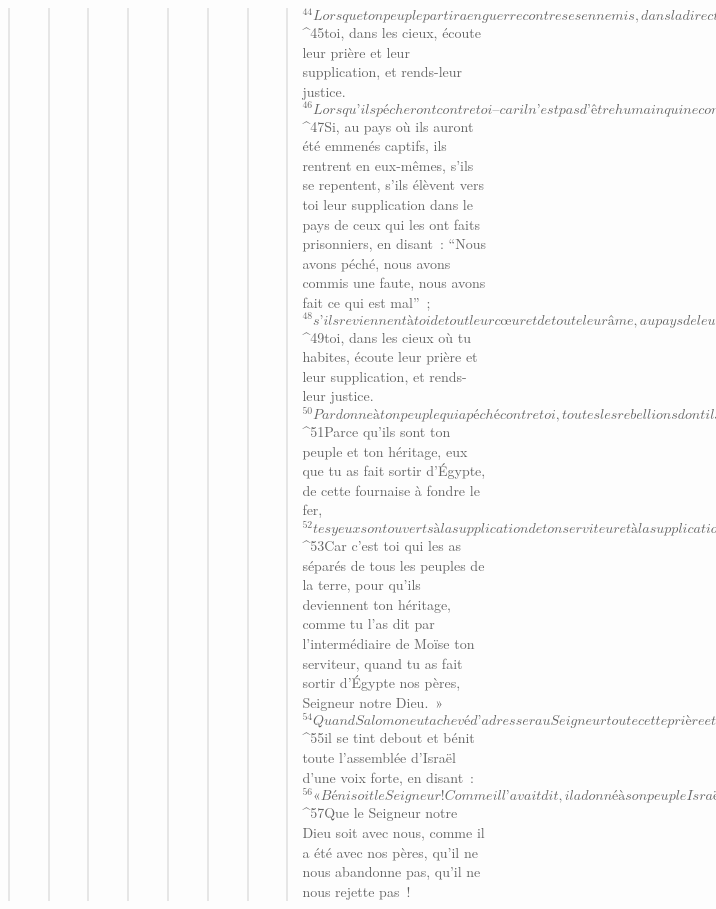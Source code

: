 \begin{verse}
\begin{verse}
\begin{verse}
\begin{verse}
\begin{verse}
\begin{verse}
\begin{verse}
\begin{verse}
${}^{44}Lorsque ton peuple partira en guerre contre ses ennemis, dans la direction où tu l’auras envoyé, et qu’il priera le Seigneur, tourné vers la Ville que tu as choisie et vers la Maison que j’ai bâtie pour ton nom, 
${}^{45}toi, dans les cieux, écoute leur prière et leur supplication, et rends-leur justice.
${}^{46}Lorsqu’ils pécheront contre toi – car il n’est pas d’être humain qui ne commette quelque péché – et que tu seras irrité contre eux, alors tu les livreras à la merci de leurs ennemis, et leurs vainqueurs les emmèneront captifs dans un pays ennemi, lointain ou proche. 
${}^{47}Si, au pays où ils auront été emmenés captifs, ils rentrent en eux-mêmes, s’ils se repentent, s’ils élèvent vers toi leur supplication dans le pays de ceux qui les ont faits prisonniers, en disant : “Nous avons péché, nous avons commis une faute, nous avons fait ce qui est mal” ; 
${}^{48}s’ils reviennent à toi de tout leur cœur et de toute leur âme, au pays de leurs ennemis qui les auront emmenés captifs, et s’ils prient vers toi, tournés vers le pays que tu as donné à leurs pères, vers la Ville que tu as choisie et vers la Maison que j’ai bâtie pour ton nom, 
${}^{49}toi, dans les cieux où tu habites, écoute leur prière et leur supplication, et rends-leur justice. 
${}^{50}Pardonne à ton peuple qui a péché contre toi, toutes les rebellions dont il s’est rendu coupable envers toi ; fais-le prendre en pitié par ses vainqueurs, que ceux-ci les prennent en pitié. 
${}^{51}Parce qu’ils sont ton peuple et ton héritage, eux que tu as fait sortir d’Égypte, de cette fournaise à fondre le fer, 
${}^{52}tes yeux sont ouverts à la supplication de ton serviteur et à la supplication de ton peuple Israël, et tu les écoutes toutes les fois qu’ils crient vers toi. 
${}^{53}Car c’est toi qui les as séparés de tous les peuples de la terre, pour qu’ils deviennent ton héritage, comme tu l’as dit par l’intermédiaire de Moïse ton serviteur, quand tu as fait sortir d’Égypte nos pères, Seigneur notre Dieu. »
${}^{54}Quand Salomon eut achevé d’adresser au Seigneur toute cette prière et toute cette supplication, il se releva de devant l’autel du Seigneur, là où il s’était incliné et, les mains tendues vers le ciel, 
${}^{55}il se tint debout et bénit toute l’assemblée d’Israël d’une voix forte, en disant : 
${}^{56}« Béni soit le Seigneur ! Comme il l’avait dit, il a donné à son peuple Israël le pays de son repos ; aucune des promesses qu’il avait faites par l’intermédiaire de son serviteur Moïse n’est restée sans effet. 
${}^{57}Que le Seigneur notre Dieu soit avec nous, comme il a été avec nos pères, qu’il ne nous abandonne pas, qu’il ne nous rejette pas ! 

\end{verse}
\end{verse}
\end{verse}
\end{verse}
\end{verse}
\end{verse}
\end{verse}
\end{verse}
